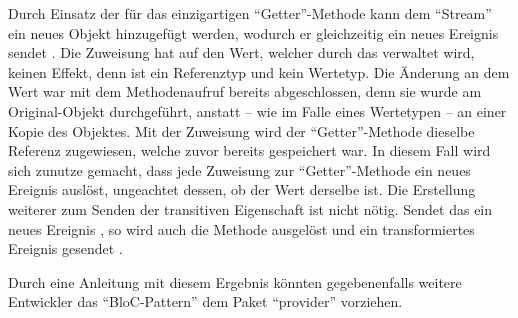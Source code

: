Durch Einsatz der für das  einzigartigen \enquote{Getter}-Methode  kann dem \enquote{Stream} ein neues Objekt hinzugefügt werden,
wodurch er gleichzeitig ein neues Ereignis sendet .
Die Zuweisung hat auf den Wert, welcher durch das  verwaltet wird, keinen Effekt, denn  ist ein Referenztyp und kein Wertetyp.
Die Änderung an dem Wert war mit dem Methodenaufruf  bereits abgeschlossen,
denn sie wurde am Original-Objekt durchgeführt, anstatt -- wie im Falle eines Wertetypen -- an einer Kopie des Objektes.
Mit der Zuweisung  wird der \enquote{Getter}-Methode dieselbe Referenz zugewiesen,
welche zuvor bereits gespeichert war.
In diesem Fall wird sich zunutze gemacht, dass jede Zuweisung zur \enquote{Getter}-Methode  ein neues Ereignis auslöst,
ungeachtet dessen, ob der Wert derselbe ist.
Die Erstellung weiterer  zum Senden der transitiven Eigenschaft  ist nicht nötig.
Sendet das   ein neues Ereignis ,
so wird auch die Methode  ausgelöst und ein transformiertes Ereignis gesendet .

Durch eine Anleitung mit diesem Ergebnis könnten gegebenenfalls weitere Entwickler das \enquote{BloC-Pattern} dem Paket \enquote{provider} vorziehen.

